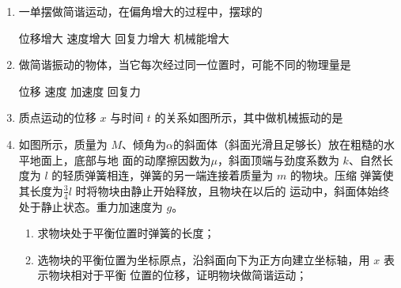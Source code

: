 
\begin{enumerate}
	\item
{}
一单摆做简谐运动，在偏角增大的过程中，摆球的  

\fourchoices
{位移增大}
{速度增大}
{回复力增大}
{机械能增大}



\item 
{}
做简谐振动的物体，当它每次经过同一位置时，可能不同的物理量是 \xzanswer{} 

\fourchoices
{位移}
{速度}
{加速度}
{回复力}

\item 
{}
质点运动的位移 $ x $ 与时间 $ t $ 的关系如图所示，其中做机械振动的是  
\pfourchoices
{}
{}
{}
{}



\item 
{}
如图所示，质量为 $ M $、倾角为$ \alpha $的斜面体（斜面光滑且足够长）放在粗糙的水平地面上，底部与地
面的动摩擦因数为$ \mu $，斜面顶端与劲度系数为 $ k $、自然长度为 $ l $
的轻质弹簧相连，弹簧的另一端连接着质量为 $ m $ 的物块。压缩
弹簧使其长度为$  \frac{ 3 }{ 4 } l $ 时将物块由静止开始释放，且物块在以后的
运动中，斜面体始终处于静止状态。重力加速度为 $ g $。
\begin{enumerate}
	\item
求物块处于平衡位置时弹簧的长度；



\item 
选物块的平衡位置为坐标原点，沿斜面向下为正方向建立坐标轴，用 $ x $ 表示物块相对于平衡
位置的位移，证明物块做简谐运动；


\end{enumerate}
\end{enumerate}
